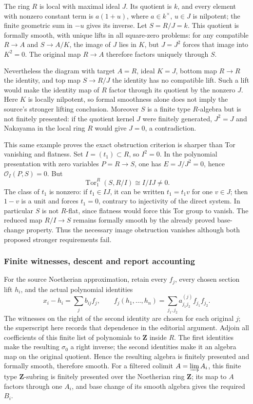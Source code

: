 The ring \(R\) is local with maximal ideal \(J\). Its quotient is \(k\), and every element with nonzero constant term is \(a(1+u)\), where \(a\in k^\times\), \(u\in J\) is nilpotent; the finite geometric sum in \(-u\) gives its inverse. Let \(S=R/J=k\). This quotient is formally smooth, with unique lifts in all square-zero problems: for any compatible \(R\to A\) and \(S\to A/K\), the image of \(J\) lies in \(K\), but \(J=J^2\) forces that image into \(K^2=0\). The original map \(R\to A\) therefore factors uniquely through \(S\).

Nevertheless the diagram with target \(A=R\), ideal \(K=J\), bottom map \(R\to R\) the identity, and top map \(S\to R/J\) the identity has no compatible lift. Such a lift would make the identity map of \(R\) factor through its quotient by the nonzero \(J\). Here \(K\) is locally nilpotent, so formal smoothness alone does not imply the source's stronger lifting conclusion. Moreover \(S\) is a finite type \(R\)-algebra but is not finitely presented: if the quotient kernel \(J\) were finitely generated, \(J^2=J\) and Nakayama in the local ring \(R\) would give \(J=0\), a contradiction.

This same example proves the exact obstruction criterion is sharper than Tor vanishing and flatness. Set \(I=(t_1)\subset R\), so \(I^2=0\). In the polynomial presentation with zero variables \(P=R\to S\), one has \(E=J/J^2=0\), hence \(\mathcal O_I(P,S)=0\). But \[
\operatorname{Tor}_1^R(S,R/I)\cong I/IJ\ne0.
\] The class of \(t_1\) is nonzero: if \(t_1\in IJ\), it can be written \(t_1=t_1v\) for one \(v\in J\); then \(1-v\) is a unit and forces \(t_1=0\), contrary to injectivity of the direct system. In particular \(S\) is not \(R\)-flat, since flatness would force this Tor group to vanish. The reduced map \(R/I\to S\) remains formally smooth by the already proved base-change property. Thus the necessary image obstruction vanishes although both proposed stronger requirements fail.

\subsubsection{Finite witnesses, descent and report accounting}\label{finite-witnesses-descent-and-report-accounting}

For the source Noetherian approximation, retain every \(f_j\), every chosen section lift \(h_i\), and the actual polynomial identities \[
x_i-h_i=\sum_j b_{ij}f_j,\qquad
f_j(h_1,\ldots,h_n)=\sum_{j_1,j_2}a^{(j)}_{j_1j_2}f_{j_1}f_{j_2}.
\] The witnesses on the right of the second identity are chosen for each original \(j\); the superscript here records that dependence in the editorial argument. Adjoin all coefficients of this finite list of polynomials to \(\mathbf Z\) inside \(R\). The first identities make the resulting \(\sigma_0\) a right inverse; the second identities make it an algebra map on the original quotient. Hence the resulting algebra is finitely presented and formally smooth, therefore smooth. For a filtered colimit \(A=\varinjlim A_i\), this finite type \(\mathbf Z\)-subring is finitely presented over the Noetherian ring \(\mathbf Z\); its map to \(A\) factors through one \(A_i\), and base change of its smooth algebra gives the required \(B_i\).

